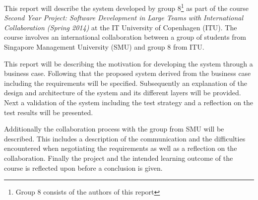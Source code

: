 \documentclass[../report.tex]{subfiles}
\begin{document}
This report will describe the system developed by group 8\footnote{Group 8 consists of the authors of this report} as part of the course \textit{Second Year Project: Software Development in Large Teams with International Collaboration (Spring 2014)} at the IT University of Copenhagen (ITU). The course involves an international collaboration between a group of students from Singapore Management University (SMU) and group 8 from ITU.

This report will be describing the motivation for developing the system through a business case. Following that the proposed system derived from the business case including the requirements will be specified. Subsequently an explanation of the design and architecture of the system and its different layers will be provided. Next a validation of the system including the test strategy and a reflection on the test results will be presented. 

Additionally the collaboration process with the group from SMU will be described. This includes a description of the communication and the difficulties encountered when negotiating the requirements as well as a reflection on the collaboration. Finally the project and the intended learning outcome of the course is reflected upon before a conclusion is given.




\end{document}
